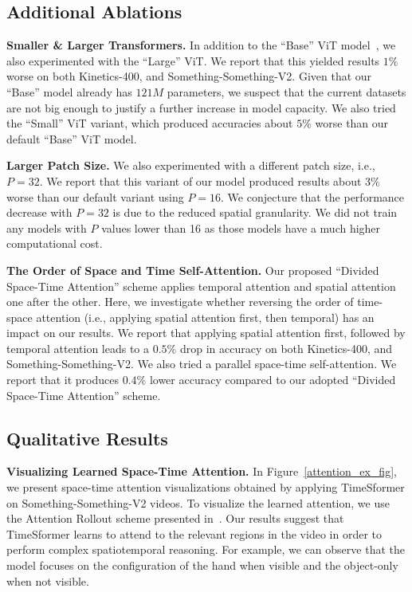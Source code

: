 \documentclass{article}
\begin{document}
\subsection{Additional Ablations}

\textbf{Smaller \& Larger Transformers.} In addition to the ``Base'' ViT model~\cite{Dosovitskiy:ICLR2021}, we also experimented with the ``Large'' ViT. We report that this yielded results $1\%$ worse on both Kinetics-400, and Something-Something-V2. Given that our ``Base'' model already has $121M$ parameters, we suspect that the current datasets are not big enough to justify a further increase in model capacity. We also tried  the ``Small'' ViT variant, which produced accuracies about $5\%$ worse than our default ``Base'' ViT model.

\textbf{Larger Patch Size.} We also experimented with a different patch size, i.e., $P=32$. We report that this variant of our model produced results about $3\%$ worse  than our default variant using $P=16$.
We conjecture that the performance decrease with $P=32$ is due to the reduced spatial granularity.
 We did not train any models with $P$ values lower than 16 as those models have a much higher computational cost.

\textbf{The Order of Space and Time Self-Attention.} Our proposed ``Divided Space-Time Attention'' scheme applies temporal attention and spatial attention one after the other. Here, we investigate whether reversing the order of time-space attention (i.e., applying spatial attention first, then temporal) has an impact on our results. We report that applying spatial attention first, followed by temporal attention leads to a $0.5\%$ drop in accuracy on both Kinetics-400, and Something-Something-V2. We also tried a parallel space-time self-attention. We report that it produces $0.4\%$ lower accuracy compared to our adopted ``Divided Space-Time Attention'' scheme.

\subsection{Qualitative Results}

\textbf{Visualizing Learned Space-Time Attention.} In Figure~\ref{attention_ex_fig}, we present space-time attention visualizations obtained by applying TimeSformer on Something-Something-V2 videos. To visualize the learned attention, we use the Attention Rollout scheme presented in~\cite{abnar2020quantifying}.  Our results suggest that TimeSformer learns to attend to the relevant regions in the video in order to perform complex spatiotemporal reasoning. For example, we can observe that the model focuses on the configuration of the hand when visible and the object-only when not visible. 
\end{document}
